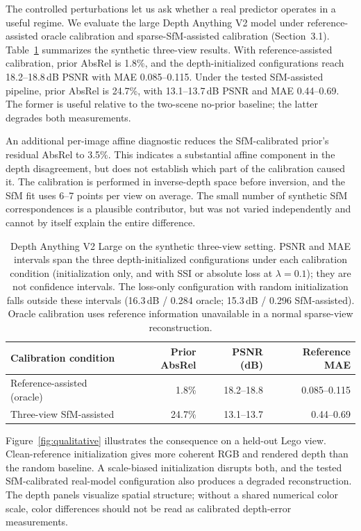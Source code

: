 \documentclass[10pt,a4paper]{article}
\begin{document}
The controlled perturbations let us ask whether a real predictor operates in a useful
regime. We evaluate the large Depth Anything V2 model under reference-assisted oracle
calibration and sparse-SfM-assisted calibration (Section~3.1).
Table~\ref{tab:dav2} summarizes the synthetic three-view results. With
reference-assisted calibration, prior AbsRel is 1.8\%, and the depth-initialized
configurations reach 18.2--18.8\,dB PSNR with MAE 0.085--0.115. Under the tested
SfM-assisted pipeline, prior AbsRel is 24.7\%, with 13.1--13.7\,dB PSNR and MAE
0.44--0.69. The former is useful relative to the two-scene no-prior baseline; the
latter degrades both measurements.

An additional per-image affine diagnostic reduces the SfM-calibrated prior's residual
AbsRel to 3.5\%. This indicates a substantial affine component in the depth
disagreement, but does not establish which part of the calibration caused it. The
calibration is performed in inverse-depth space before inversion, and the SfM fit
uses 6--7 points per view on average. The small number of synthetic SfM
correspondences is a plausible contributor, but was not varied independently and
cannot by itself explain the entire difference.

\begin{table}[!htbp]\centering\small
\caption{Depth Anything V2 Large on the synthetic three-view setting. PSNR and MAE
intervals span the three depth-initialized configurations under each calibration
condition (initialization only, and with SSI or absolute loss at $\lambda=0.1$); they
are not confidence intervals. The loss-only configuration with random initialization
falls outside these intervals (16.3\,dB / 0.284 oracle; 15.3\,dB / 0.296 SfM-assisted).
Oracle calibration uses reference information unavailable in a normal sparse-view
reconstruction.}
\label{tab:dav2}
\begin{tabular}{lrrr}
\toprule
Calibration condition & Prior AbsRel & PSNR (dB) & Reference MAE\\
\midrule
Reference-assisted (oracle) & 1.8\% & 18.2--18.8 & 0.085--0.115\\
Three-view SfM-assisted & 24.7\% & 13.1--13.7 & 0.44--0.69\\
\bottomrule
\end{tabular}
\end{table}

Figure~\ref{fig:qualitative} illustrates the consequence on a held-out Lego view.
Clean-reference initialization gives more coherent RGB and rendered depth than the
random baseline. A scale-biased initialization disrupts both, and the tested
SfM-calibrated real-model configuration also produces a degraded reconstruction. The
depth panels visualize spatial structure; without a shared numerical color scale,
color differences should not be read as calibrated depth-error measurements.
\end{document}
